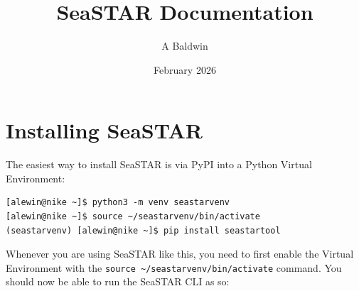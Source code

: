 \documentclass[11pt]{article}
\title{SeaSTAR Documentation}
\author{A Baldwin}
\date{February 2026}
\begin{document}
\maketitle

\begin{abstract}

\end{abstract}

\tableofcontents

\newpage
\section{Installing SeaSTAR}

The easiest way to install SeaSTAR is via PyPI into a Python Virtual Environment:

\begin{lstlisting}
[alewin@nike ~]$ python3 -m venv seastarvenv
[alewin@nike ~]$ source ~/seastarvenv/bin/activate
(seastarvenv) [alewin@nike ~]$ pip install seastartool
\end{lstlisting}

Whenever you are using SeaSTAR like this, you need to first enable the Virtual Environment with the \texttt{source \~{}/seastarvenv/bin/activate} command. You should now be able to run the SeaSTAR CLI as so:
\end{document}
